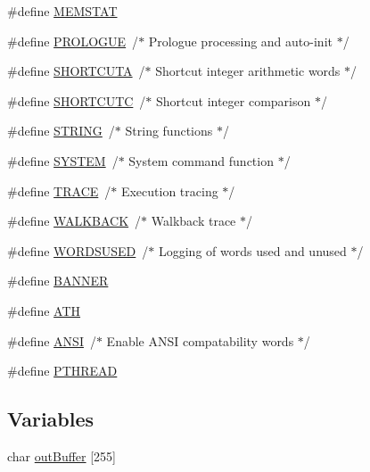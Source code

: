 \begin{DoxyCompactItemize}
\item 
\#define \hyperlink{linux-atlcfig_8h_a90dbf4dc4f15c07ffcf27e0b757187a7}{M\+E\+M\+S\+T\+AT}
\item 
\#define \hyperlink{linux-atlcfig_8h_a59f8a4119207355f67b920d35ec6cc8e}{P\+R\+O\+L\+O\+G\+UE}~/$\ast$ Prologue processing and auto-\/init $\ast$/
\item 
\#define \hyperlink{linux-atlcfig_8h_ae957ba08823687327a6f74f8ba99cf01}{S\+H\+O\+R\+T\+C\+U\+TA}~/$\ast$ Shortcut integer arithmetic words $\ast$/
\item 
\#define \hyperlink{linux-atlcfig_8h_a7fb6c8bc5e9315d6ad8ecc8f29d22a9a}{S\+H\+O\+R\+T\+C\+U\+TC}~/$\ast$ Shortcut integer comparison $\ast$/
\item 
\#define \hyperlink{linux-atlcfig_8h_a0f4d394a3ab4e09bff60f714c66dc5ee}{S\+T\+R\+I\+NG}~/$\ast$ String functions $\ast$/
\item 
\#define \hyperlink{linux-atlcfig_8h_a21b97df85e65556468b28a576311271c}{S\+Y\+S\+T\+EM}~/$\ast$ System command function $\ast$/
\item 
\#define \hyperlink{linux-atlcfig_8h_aad9cc64d45a76ba0d37c00f8cd9caa37}{T\+R\+A\+CE}~/$\ast$ Execution tracing $\ast$/
\item 
\#define \hyperlink{linux-atlcfig_8h_a8a545fc997e24de1bdccb3454442ddee}{W\+A\+L\+K\+B\+A\+CK}~/$\ast$ Walkback trace $\ast$/
\item 
\#define \hyperlink{linux-atlcfig_8h_a1832f63df1cc6543af5e3de731b77dac}{W\+O\+R\+D\+S\+U\+S\+ED}~/$\ast$ Logging of words used and unused $\ast$/
\item 
\#define \hyperlink{linux-atlcfig_8h_a46c1fb0f4185dc45eda625530bc0fd73}{B\+A\+N\+N\+ER}
\item 
\#define \hyperlink{linux-atlcfig_8h_a55fc4596d1f1291f82c8574e9e4a8369}{A\+TH}
\item 
\#define \hyperlink{linux-atlcfig_8h_a9382b15380bf4f6adaafd94f1c78991a}{A\+N\+SI}~/$\ast$ Enable A\+N\+SI compatability words $\ast$/
\item 
\#define \hyperlink{linux-atlcfig_8h_a8d405b287035ae3af81f5b5ceceed4cd}{P\+T\+H\+R\+E\+AD}
\end{DoxyCompactItemize}
\subsection*{Variables}
\begin{DoxyCompactItemize}
\item 
char \hyperlink{linux-atlcfig_8h_a2f25dee1596892b07e30dd78f5ebe81b}{out\+Buffer} \mbox{[}255\mbox{]}
\end{DoxyCompactItemize}


